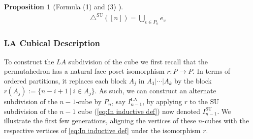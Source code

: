 \documentclass{amsart}
\newtheorem{proposition}[theorem]{Proposition}
\theoremstyle{definition}
\newcommand{\SU}{\mathrm{SU}}
\newcommand{\LA}{\mathrm{LA}}
\newcommand{\SUD}{\triangle^{\mathrm{SU}}}
\newcommand{\maxsubdivpairsv}{\overline{e_v}}
\begin{document}
\begin{proposition}[Formula (1) and (3) \cite{saneblidzeComparingDiagonalsAssociahedra2022}]
\begin{align*}
    \SUD([n]) = \bigcup_{v \in P_n} \maxsubdivpairsv
\end{align*}
\end{proposition}

\subsubsection{LA Cubical Description}

To construct the $LA$ subdivision of the cube we first recall that the permutahedron has a natural face poset isomorphism $r:P\to P$. 
In terms of ordered partitions, it replaces each block $A_j$ in $A_1 | \cdots | A_k$ by the block $r(A_j):=\{n-i+1 \ | \ i \in A_j\}$.
As such, we can construct an alternate subdivision of the $n-1$-cube by $P_n$, say $I_{n-1}^{\LA}$, by applying $r$ to the $\SU$ subdivision of the $n-1$ cube (\cref{eq:In inductive def})
now denoted $I_{n-1}^{\SU}$.
We illustrate the first few generations, aligning the vertices of these $n$-cubes with the respective vertices of \cref{eq:In inductive def} under the isomorphism $r$.
\end{document}
